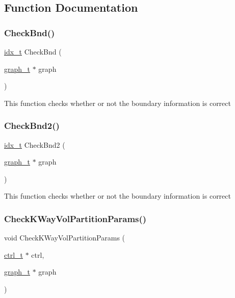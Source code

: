 \subsection{Function Documentation}
\mbox{\label{a00882_addb0519d730bbc2793667e245d7de9b4}} 
\subsubsection{\texorpdfstring{Check\+Bnd()}{CheckBnd()}}
{\footnotesize\ttfamily \hyperlink{a00876_aaa5262be3e700770163401acb0150f52}{idx\+\_\+t} Check\+Bnd (\begin{DoxyParamCaption}\item[{\hyperlink{a00734}{graph\+\_\+t} $\ast$}]{graph }\end{DoxyParamCaption})}

This function checks whether or not the boundary information is correct \mbox{\label{a00882_ad8de8465eafe229cfa7f0f51fd9d693f}} 
\subsubsection{\texorpdfstring{Check\+Bnd2()}{CheckBnd2()}}
{\footnotesize\ttfamily \hyperlink{a00876_aaa5262be3e700770163401acb0150f52}{idx\+\_\+t} Check\+Bnd2 (\begin{DoxyParamCaption}\item[{\hyperlink{a00734}{graph\+\_\+t} $\ast$}]{graph }\end{DoxyParamCaption})}

This function checks whether or not the boundary information is correct \mbox{\label{a00882_a70f506aae12b862f495f3dec9a8f4fc3}} 
\subsubsection{\texorpdfstring{Check\+K\+Way\+Vol\+Partition\+Params()}{CheckKWayVolPartitionParams()}}
{\footnotesize\ttfamily void Check\+K\+Way\+Vol\+Partition\+Params (\begin{DoxyParamCaption}\item[{\hyperlink{a00742}{ctrl\+\_\+t} $\ast$}]{ctrl,  }\item[{\hyperlink{a00734}{graph\+\_\+t} $\ast$}]{graph }\end{DoxyParamCaption})}

